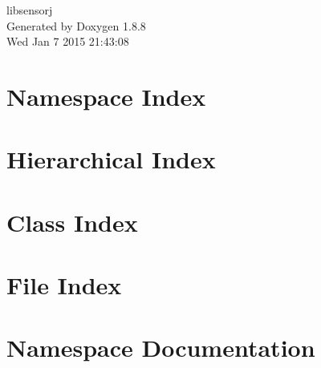 \documentclass[twoside]{book}
\newcommand{\+}{\discretionary{\mbox{\scriptsize$\hookleftarrow$}}{}{}}
\newcommand{\clearemptydoublepage}{%
  \newpage{\pagestyle{empty}\cleardoublepage}%
}
\begin{document}
\hypersetup{pageanchor=false,
             bookmarks=true,
             bookmarksnumbered=true,
             pdfencoding=unicode
            }
\begin{titlepage}
\vspace*{7cm}
\begin{center}%
{\Large libsensorj }\\
\vspace*{1cm}
{\large Generated by Doxygen 1.8.8}\\
\vspace*{0.5cm}
{\small Wed Jan 7 2015 21:43:08}\\
\end{center}
\end{titlepage}
\clearemptydoublepage
\tableofcontents
\clearemptydoublepage
{}
\hypersetup{pageanchor=true}

\chapter{Namespace Index}

\chapter{Hierarchical Index}

\chapter{Class Index}

\chapter{File Index}

\chapter{Namespace Documentation}


















\end{document}
